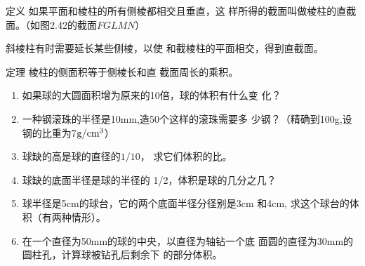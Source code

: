 \begin{blk}{定义}
    如果平面和棱柱的所有侧棱都相交且垂直，这
样所得的截面叫做棱柱的直截面。（如图2.42的截面$FGLM
N$）
\end{blk}

斜棱柱有时需要延长某些侧棱，以使
和截棱柱的平面相交，得到直截面。

\begin{blk}
    {定理} 棱柱的侧面积等于侧棱长和直
截面周长的乘积。
\end{blk}




















































\begin{ex}
\begin{enumerate}
    \item 如果球的大圆面积增为原来的10倍，球的体积有什么变
    化？
    \item 一种钢滚珠的半径是10mm,造50个这样的滚珠需要多
    少钢？（精确到100g,设钢的比重为7${\rm g/cm^3}$）
    \item 球缺的高是球的直径的$1/10$，
    求它们体积的比。
    \item 球缺的底面半径是球的半径的
    1/2，体积是球的几分之几？
    \item 球半径是5cm的球台，它的两个底面半径分径别是3cm
    和4cm, 求这个球台的体积（有两种情形）。
    \item 在一个直径为50mm的球的中央，以直径为轴钻一个底
    面圆的直径为30mm的圆柱孔，计算球被钻孔后剩余下
    的部分体积。
\end{enumerate}
\end{ex}

